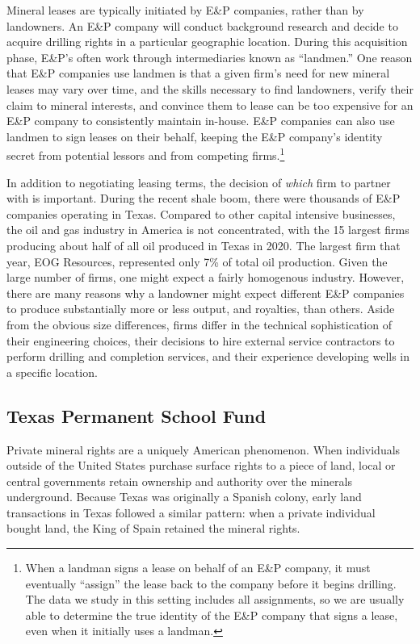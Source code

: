 Mineral leases are typically initiated by E\&P companies, rather than by landowners. An E\&P company will conduct background research and decide to acquire drilling rights in a particular geographic location. During this acquisition phase, E\&P's often work through intermediaries known as ``landmen.'' One reason that E\&P companies use landmen is that a given firm's need for new mineral leases may vary over time, and the skills necessary to find landowners, verify their claim to mineral interests, and convince them to lease can be too expensive for an E\&P company to consistently maintain in-house. E\&P companies can also use landmen to sign leases on their behalf, keeping the E\&P company's identity secret from potential lessors and from competing firms.\footnote{When a landman signs a lease on behalf of an E\&P company, it must eventually ``assign'' the lease back to the company before it begins drilling.  The data we study in this setting includes all assignments, so we are usually able to determine the true identity of the E\&P company that signs a lease, even when it initially uses a landman.} 

In addition to negotiating leasing terms, the decision of \emph{which} firm to partner with is important.  During the recent shale boom, there were thousands of E\&P companies operating in Texas.  Compared to other capital intensive businesses, the oil and gas industry in America is not concentrated, with the 15 largest firms producing about half of all oil produced in Texas in 2020.  The largest firm that year, EOG Resources, represented only 7\% of total oil production.  Given the large number of firms, one might expect a fairly homogenous industry.  However, there are many reasons why a landowner might expect different E\&P companies to produce substantially more or less output, and royalties, than others.  Aside from the obvious size differences, firms differ in the technical sophistication of their engineering choices, their decisions to hire external service contractors to perform drilling and completion services, and their experience developing wells in a specific location. 

\subsection{Texas Permanent School Fund \label{sec:PSF}}

Private mineral rights are a uniquely American phenomenon. When individuals outside of the United States purchase surface rights to a piece of land, local or central governments retain ownership and authority over the minerals underground. Because Texas was originally a Spanish colony, early land transactions in Texas followed a similar pattern: when a private individual bought land, the King of Spain retained the mineral rights. 

